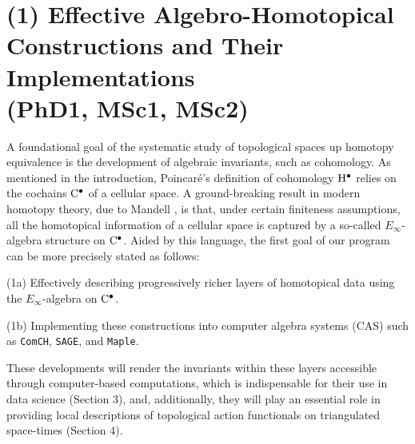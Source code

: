 
\section*{(1) Effective Algebro-Homotopical Constructions and Their Implementations \\ (PhD1, MSc1, MSc2)}

A foundational goal of the systematic study of topological spaces up homotopy equivalence is the development of algebraic invariants, such as cohomology.
As mentioned in the introduction, Poincar\'e's definition of cohomology $\mathrm{H}^\bullet$ relies on the cochains $\mathrm{C}^\bullet$ of a cellular space.
A ground-breaking result in modern homotopy theory, due to Mandell \cite{mandell2006homotopy_type}, is that, under certain finiteness assumptions, all the homotopical information of a cellular space is captured by a so-called $E_\infty$-algebra structure on $\mathrm{C}^\bullet$.
Aided by this language, the first goal of our program can be more precisely stated as follows:

\smallskip\noindent(1a) Effectively describing progressively richer layers of homotopical data using the $E_\infty$-algebra on $\mathrm{C}^\bullet$.\par
\noindent(1b) Implementing these constructions into computer algebra systems (CAS) such as \texttt{ComCH}, \texttt{SAGE}, and \texttt{Maple}.

\smallskip\noindent These developments will render the invariants within these layers accessible through computer-based computations, which is indispensable for their use in data science (Section 3), and, additionally, they will play an essential role in providing local descriptions of topological action functionals on triangulated space-times (Section 4).

